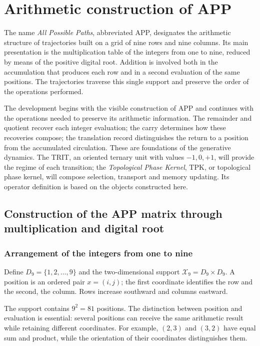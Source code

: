 \section{Arithmetic construction of APP}
\label{app:construccion-explicita}

The name \emph{All Possible Paths}, abbreviated APP, designates the arithmetic structure of trajectories built on a grid of nine rows and nine columns. Its main presentation is the multiplication table of the integers from one to nine, reduced by means of the positive digital root. Addition is involved both in the accumulation that produces each row and in a second evaluation of the same positions. The trajectories traverse this single support and preserve the order of the operations performed.

The development begins with the visible construction of APP and continues with the operations needed to preserve its arithmetic information. The remainder and quotient recover each integer evaluation; the carry determines how these recoveries compose; the translation record distinguishes the return to a position from the accumulated circulation. These are foundations of the generative dynamics. The TRIT, an oriented ternary unit with values $-1,0,+1$, will provide the regime of each transition; the \emph{Topological Phase Kernel}, TPK, or topological phase kernel, will compose selection, transport and memory updating. Its operator definition is based on the objects constructed here.

\subsection{Construction of the APP matrix through multiplication and digital root}
\label{sec:app-soporte}

\subsubsection{Arrangement of the integers from one to nine}

\begin{definicion}
\label{def:app-soporte}
Define $D_9=\{1,2,\ldots,9\}$ and the two-dimensional support $\mathcal X_9=D_9\times D_9$. A position is an ordered pair $x=(i,j)$; the first coordinate identifies the row and the second, the column. Rows increase southward and columns eastward.
\end{definicion}

The support contains $9^2=81$ positions. The distinction between position and evaluation is essential: several positions can receive the same arithmetic result while retaining different coordinates. For example, $(2,3)$ and $(3,2)$ have equal sum and product, while the orientation of their coordinates distinguishes them.

